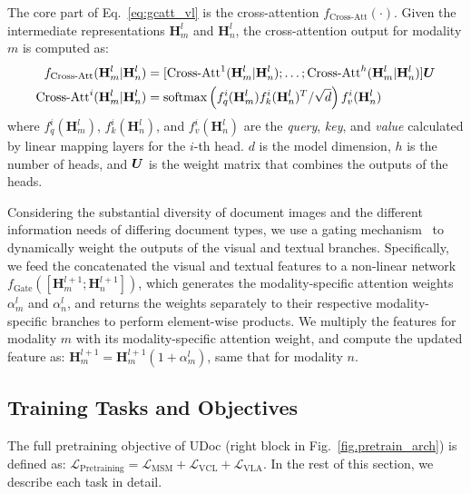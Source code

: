 \documentclass{article}
\begin{document}
	The core part of Eq.~\ref{eq:gcatt_vl} is the cross-attention $f_{\text{Cross-Att}}(\cdot)$. Given the intermediate representations $\mathbf{H}_m^l$ and $\mathbf{H}_n^l$, the cross-attention output for modality $m$ is computed as:
	\begin{align}
		f_{\text{Cross-Att}} (\mathbf{H}_{m}^l|\mathbf{H}_{n}^l) &= [\text{Cross-Att}^1(\mathbf{H}_{m}^l|\mathbf{H}_{n}^l);\ldots;\text{Cross-Att}^h(\mathbf{H}_{m}^l|\mathbf{H}_{n}^l)]{\bm{U}} \label{eq:self-attn}\\
		\text{Cross-Att}^i(\mathbf{H}_{m}^l|\mathbf{H}_{n}^l) &= {\text{softmax}\left(f^i_{q}(\mathbf{H}_m^l)f^i_k(\mathbf{H}_{n}^l)^T/\sqrt{d}\right)f^i_v(\mathbf{H}_{n}^l)}
	\end{align}
	{where $f^i_q(\mathbf{H}_m^l)$, $f^i_k(\mathbf{H}_n^l)$, and $f^i_v(\mathbf{H}_n^l)$ are the {\textit{query}}, {\textit{key}}, and {\textit{value}} calculated by linear mapping layers for the $i$-th head. $d$ is the model dimension, $h$ is the number of heads, and ${\bm{U}}$ is the weight matrix that combines the outputs of the heads.}
	
	Considering the {substantial diversity} of document images {and {the different information needs of differing} document types}, we use a gating mechanism~\cite{hu2018squeeze} to {dynamically weight} the outputs {of {the} visual and textual branches}. Specifically, {we feed the concatenated the visual and textual features to a non-linear network} $f_{\text{Gate}}([\mathbf{H}_m^{l+1} ;\mathbf{H}_n^{l+1} ])$, {which generates the modality-specific attention weights} $\alpha_m^l$ and $\alpha_n^l$, and returns the weights separately to {their respective modality-specific branches to perform element-wise products. We multiply the features for modality $m$ with its modality-specific attention weight, and compute the {updated} feature as: $\mathbf{H}_m^{l+1} = \mathbf{H}_m^{l+1} (1+ \alpha_m^l)$, same that for modality $n$.}
	
	\subsection{Training Tasks and Objectives}\label{sec:pre_training_tasks}
	The full pretraining objective of UDoc (right block in Fig.~\ref{fig.pretrain_arch})  is defined as: $\mathcal{L}_{\text{Pretraining}} = \mathcal{L}_{\text{MSM}} + \mathcal{L}_{\text{VCL}} + \mathcal{L}_{\text{VLA}}$. {In the rest of this section}, we describe each task in detail.
	
\end{document}
